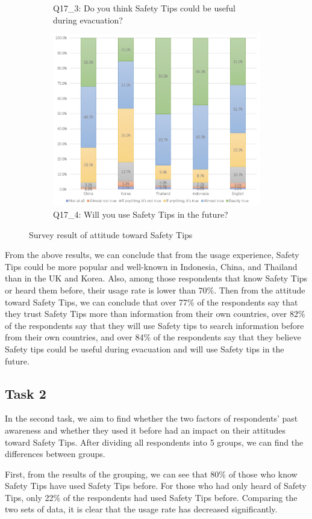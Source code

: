 \begin{figure}[h]
\begin{subfigure}{0.48\textwidth}
  \centering
  \caption{Q17\_3: Do you think Safety Tips could be useful during evacuation?}
  \label{fig17}
  \end{subfigure}\hfill
  \begin{subfigure}{0.48\textwidth}
  \includegraphics[width=0.6\linewidth]{Figure/Figure18.jpg}
  \centering
  \caption{Q17\_4: Will you use Safety Tips in the future?}
  \label{fig18}
  \end{subfigure}
  \caption{Survey result of attitude toward Safety Tips}
\end{figure}



From the above results, we can conclude that from the usage experience, Safety Tips could be more popular and well-known in Indonesia, China, and Thailand than in the UK and Korea. Also, among those respondents that know Safety Tips or heard them before, their usage rate is lower than 70\%. Then from the attitude toward Safety Tips, we can conclude that over 77\% of the respondents say that they trust Safety Tips more than information from their own countries, over 82\% of the respondents say that they will use Safety tips to search information before from their own countries, and over 84\% of the respondents say that they believe Safety tips could be useful during evacuation and will use Safety tips in the future.


\subsection{Task 2}
In the second task, we aim to find whether the two factors of respondents' past awareness and whether they used it before had an impact on their attitudes toward Safety Tips. After dividing all respondents into 5 groups, we can find the differences between groups. 

First, from the results of the grouping, we can see that 80\% of those who know Safety Tips have used Safety Tips before. For those who had only heard of Safety Tips, only 22\% of the respondents had used Safety Tips before. Comparing the two sets of data, it is clear that the usage rate has decreased significantly.

